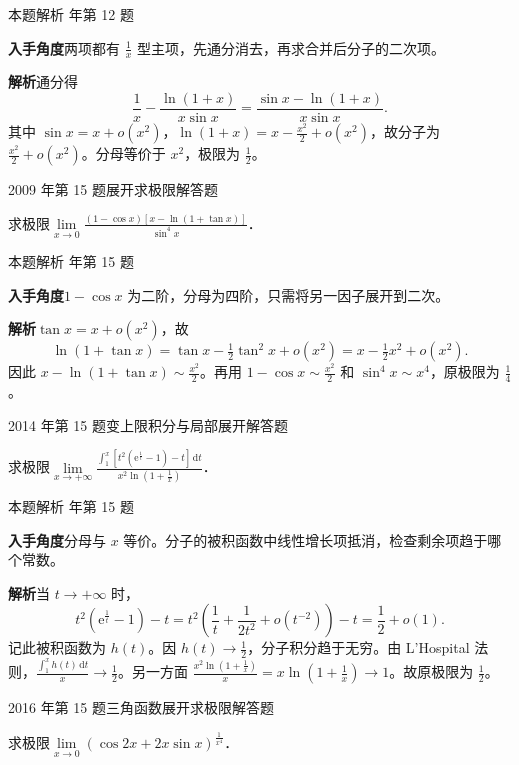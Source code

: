 \documentclass[UTF8,zihao=-4,fontset=fandol]{ctexart}
\renewcommand{\lim}{\operatorname*{lim}\limits}
\newcommand{\QuestionPage}[6]{%
  \par\noindent\begin{minipage}{\linewidth}
  \raggedright
  {\small\textcolor{black!60}{#3\quad #5}\hfill\textcolor{accent}{#2}}\par\smallskip}
\newcommand{\QuestionEnd}{\end{minipage}\par\medskip}
\newcommand{\QuestionPage}[6]{%
  \clearpage
  {\small\textcolor{accent}{#1\hfill #2}}\par\medskip
  {\small\textcolor{black!60}{#3\quad #5\hfill #6}}\par\vspace{9bp}}
\newcommand{\QuestionEnd}{}
\newenvironment{QuestionSolution}[1]{%
  \clearpage
  {\small\textcolor{black!60}{本题解析\quad #1}}\par\medskip
}{\par\clearpage}
\begin{document}
\begin{QuestionSolution}{2026 年第 12 题}
\textbf{入手角度}\quad 两项都有 \(\frac{1}{x}\) 型主项，先通分消去，再求合并后分子的二次项。

\textbf{解析}\quad 通分得
\[
\frac1x-\frac{\ln(1+x)}{x\sin x}
=\frac{\sin x-\ln(1+x)}{x\sin x}.
\]
其中 \(\sin x=x+o(x^2)\)，\(\ln(1+x)=x-\frac{x^2}{2}+o(x^2)\)，故分子为 \(\frac{x^2}{2}+o(x^2)\)。分母等价于 \(x^2\)，极限为 \(\boxed{\frac{1}{2}}\)。
\end{QuestionSolution}

\QuestionPage{2.5 Taylor定理及其应用}{解答题}{2009 年第 15 题}{3}{展开求极限}{101 / 234}
求极限$\lim_{x \to 0} \frac{\left(1 - \cos x \right)\left[x - \ln(1 + \tan x) \right]}{\sin^4 x}$．
\QuestionEnd

\begin{QuestionSolution}{2009 年第 15 题}
\textbf{入手角度}\quad \(1-\cos x\) 为二阶，分母为四阶，只需将另一因子展开到二次。

\textbf{解析}\quad \(\tan x=x+o(x^2)\)，故
\[
\ln(1+\tan x)=\tan x-\tfrac12\tan^2x+o(x^2)
=x-\tfrac12x^2+o(x^2).
\]
因此 \(x-\ln(1+\tan x)\sim \frac{x^2}{2}\)。再用 \(1-\cos x\sim \frac{x^2}{2}\) 和 \(\sin^4 x\sim x^4\)，原极限为 \(\boxed{\frac{1}{4}}\)。
\end{QuestionSolution}

\QuestionPage{2.5 Taylor定理及其应用}{解答题}{2014 年第 15 题}{2}{变上限积分与局部展开}{102 / 234}
求极限$\lim_{x \to +\infty}
\frac{\int_1^x \left[t^2\left(\mathrm{e}^{\frac{1}{t}} - 1\right) - t \right]\,\mathrm{d} t}
     {x^2\ln \left(1 + \frac{1}{x}\right)}$．
\QuestionEnd

\begin{QuestionSolution}{2014 年第 15 题}
\textbf{入手角度}\quad 分母与 \(x\) 等价。分子的被积函数中线性增长项抵消，检查剩余项趋于哪个常数。

\textbf{解析}\quad 当 \(t\to+\infty\) 时，
\[
t^2(\mathrm{e}^{\frac{1}{t}}-1)-t
=t^2\left(\frac1t+\frac1{2t^2}+o(t^{-2})\right)-t
=\frac12+o(1).
\]
记此被积函数为 \(h(t)\)。因 \(h(t)\to\frac{1}{2}\)，分子积分趋于无穷。由 L'Hospital 法则，\(\frac{\int_1^x h(t)\,\mathrm{d}t}{x}\to\frac{1}{2}\)。另一方面 \(\frac{x^2\ln(1+\frac{1}{x})}{x}=x\ln(1+\frac{1}{x})\to1\)。故原极限为 \(\boxed{\frac{1}{2}}\)。
\end{QuestionSolution}

\QuestionPage{2.5 Taylor定理及其应用}{解答题}{2016 年第 15 题}{2}{三角函数展开求极限}{103 / 234}
求极限$\lim_{x \to 0} (\cos 2x + 2x\sin x)^{\frac{1}{x^4}}$．
\QuestionEnd
\end{document}

